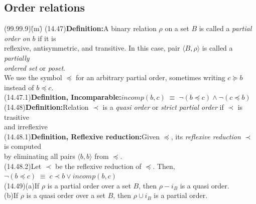 \documentclass{amsart}
\newcommand{\lgap}{2pt}                             %
\newcommand{\llgap}{6pt}                            %
\newcommand{\equivs}{\ensuremath{\;\equiv\;}}       %
\begin{document}
\subsection*{Order relations}
\begin{tabbing}
(99.99.9)\;\=(m)\;\=\kill
(14.47)\>\textbf{Definition:}\quad A binary relation $\rho$ on a set $B$ is called a \emph{partial order on} $b$ if it is\\[\lgap]
       \>reflexive, antisymmetric, and transitive. In this case, pair $\langle B, \rho\rangle$ is called a \emph{partially}\\[\lgap]
       \>\emph{ordered set} or \emph{poset}.\\[\lgap]
We use the symbol $\preceq$ for an arbitrary partial order, sometimes writing $c\succeq b$ instead of $b\preceq c$.\\[\llgap]
(14.47.1)\>\textbf{Definition, Incomparable:}\quad $incomp(b,c) \equivs \neg (b\preceq c) \land \neg (c\preceq b)$\\[\lgap]
(14.48)\>\textbf{Definition:}\quad Relation $\prec$ is a \emph{quasi order} or \emph{strict partial order} if $\prec$ is trasitive\\[\lgap]
       \>and irreflexive\\[\lgap]
(14.48.1)\>\textbf{Definition, Reflexive reduction:}\quad Given $\preceq$, its \emph{reflexive reduction} $\prec$ is computed\\[\lgap]
         \>by eliminating all pairs $\langle b,b\rangle$ from $\preceq$.\\[\lgap]
(14.48.2)\>Let $\prec$ be the reflexive reduction of $\preceq$. Then,\\[\lgap]
         \>$\neg (b\preceq c) \equivs c\prec b \lor incomp(b,c)$\\[\lgap]
(14.49)\>(a)\>If $\rho$ is a partial order over a set $B$, then $\rho - i_{B}$ is a quasi order.\\[\lgap]
       \>(b)\>If $\rho$ is a quasi order over a set $B$, then $\rho \cup i_{B}$ is a partial order.\\[\lgap]
\end{tabbing}
\end{document}
